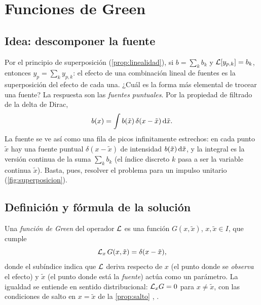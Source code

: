\section{Funciones de Green}\label{sec:green}

\subsection{Idea: descomponer la fuente}\label{sec:idea-green}
Por el principio de superposición (\cref{prop:linealidad}), si
$b=\sum_kb_k$ y $\mathcal{L}[y_{p,k}]=b_k$, entonces $y_p=\sum_ky_{p,k}$: el efecto
de una combinación lineal de fuentes es la superposición del efecto de cada
una. ¿Cuál es la forma más elemental de trocear una fuente? La respuesta
son las \emph{fuentes puntuales}. Por la propiedad de filtrado de la delta
de Dirac,
\begin{equation}\label{eq:filtrado}
  b(x)=\int b(\tilde x)\,\delta(x-\tilde x)\,\mathrm{d}\tilde x .
\end{equation}
La fuente se ve así como una fila de picos infinitamente estrechos: en cada
punto $\tilde x$ hay una fuente puntual $\delta(x-\tilde x)$ de intensidad
$b(\tilde x)\,\mathrm{d}\tilde x$, y la integral es la versión continua de la suma
$\sum_kb_k$ (el índice discreto $k$ pasa a ser la variable continua
$\tilde x$). Basta, pues, resolver el problema para un impulso unitario
(\cref{fig:superposicion}).



\subsection{Definición y fórmula de la solución}\label{sec:def-green}

\begin{definicion}\label{def:green}
Una \emph{función de Green} del operador $\mathcal{L}$ es una función
$G(x,\tilde x)$, $x,\tilde x\in I$, que cumple
\begin{equation}\label{eq:green}
  \mathcal{L}_x\,G(x,\tilde x)=\delta(x-\tilde x),
\end{equation}
donde el subíndice indica que $\mathcal{L}$ deriva respecto de $x$ (el punto donde
se \emph{observa} el efecto) y $\tilde x$ (el punto donde está la
\emph{fuente}) actúa como un parámetro. La igualdad se entiende en sentido
distribucional: $\mathcal{L}_xG=0$ para $x\neq\tilde x$, con las condiciones de
salto en $x=\tilde x$ de la \cref{prop:salto}
\textup{\cite{STAKGOLD}, \cite[cap.~10]{ARFKEN}}.
\end{definicion}

